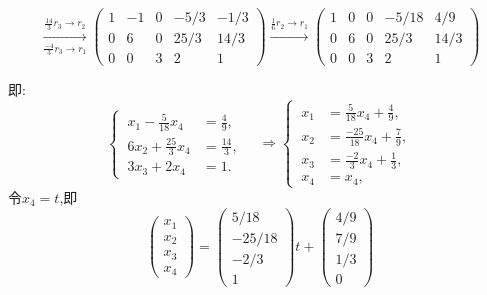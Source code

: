\documentclass{article}
\begin{document}
\begin{enumerate}
\begin{enumerate}
            \[
            \xrightarrow[\frac{-4}{3}r_3 \rightarrow r_1]{\frac{14}{3}r_3 \rightarrow r_2}
            \left(
                    \begin{array}{ccccc}
                        1& -1& 0& -5/3& -1/3\\
                        0& 6& 0& 25/3& 14/3\\
                        0& 0& 3& 2& 1
                    \end{array}
                \right)
            \xrightarrow{\frac{1}{6}r_2 \rightarrow r_1}
            \left(
                    \begin{array}{ccccc}
                        1& 0& 0& -5/18& 4/9\\
                        0& 6& 0& 25/3& 14/3\\
                        0& 0& 3& 2& 1
                    \end{array}
                \right)
            \]

            即:
            \[
                \begin{cases}
                    \ x_1 -\frac{5}{18}x_4 &=\frac{4}{9},\\
                    \ 6x_2 +\frac{25}{3}x_4 &=\frac{14}{3},\\
                    \ 3x_3 +2x_4 &=1.
                \end{cases}
                \quad \Rightarrow
                \begin{cases}
                    \ x_1&=\frac{5}{18}x_4+\frac{4}{9},\\
                    \ x_2&=\frac{-25}{18}x_4+\frac{7}{9},\\
                    \ x_3&=\frac{-2}{3}x_4+\frac{1}{3},\\
                    \ x_4&=x_4,
                \end{cases}
            \]
            令$x_4=t$,即
            \[
                \left(
                    \begin{array}{ccc}
                        x_1\\
                        x_2\\
                        x_3\\
                        x_4
                    \end{array}
                \right)
                =
                \left(\begin{array}{ccc}
                        5/18\\
                        -25/18\\
                        -2/3\\
                        1
                    \end{array}\right)
                t+
                \left(\begin{array}{ccc}
                        4/9\\
                        7/9\\
                        1/3\\
                        0
                    \end{array}\right)
            \]
    

\end{enumerate}
\end{enumerate}
\end{document}
